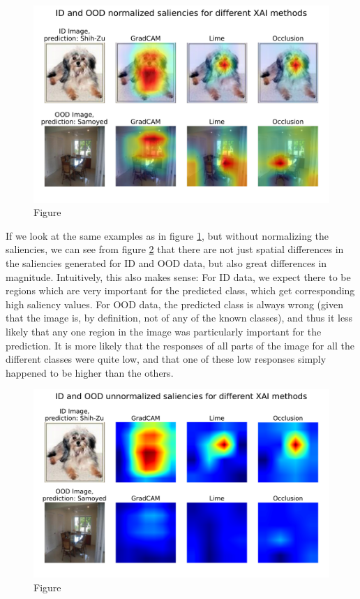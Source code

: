 \documentclass[UKenglish]{uiomasterthesis} %
\theoremstyle{definition}
\begin{document}
\begin{figure}[h]
\centerline{\includegraphics[width=5.25in]{figure/imagewoof_normalized_sal.pdf}}
\caption{Figure}
\label{fig:imagewoof_norm}
\end{figure}

If we look at the same examples as in figure \ref{fig:imagewoof_norm}, but without normalizing the saliencies, we can see from figure \ref{fig:imagewoof_unnorm} that there are not just spatial differences in the saliencies generated for ID and OOD data, but also great differences in magnitude. Intuitively, this also makes sense: For ID data, we expect there to be regions which are very important for the predicted class, which get corresponding high saliency values. For OOD data, the predicted class is always wrong (given that the image is, by definition, not of any of the known classes), and thus it less likely that any one region in the image was particularly important for the prediction. It is more likely that the responses of all parts of the image for all the different classes were quite low, and that one of these low responses simply happened to be higher than the others.

\begin{figure}[ht]
\centerline{\includegraphics[width=6.25in]{figure/imagewoof_unnormalized_sal.pdf}}
\caption{Figure}
\label{fig:imagewoof_unnorm}
\end{figure}
\end{document}
